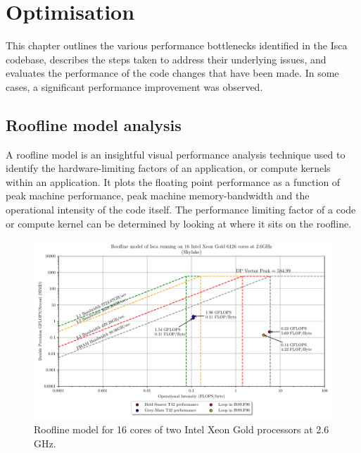 \documentclass[a4paper,11pt]{report}
\begin{document}
\let\textcircled=\pgftextcircled
\chapter[Optimisation]{Optimisation}
\label{chap:optimiations}
This chapter outlines the various performance bottlenecks identified in the Isca codebase, describes the steps taken to address their underlying issues, and evaluates the performance of the code changes that have been made. In some cases, a significant performance improvement was observed. 

\section{Roofline model analysis}
A roofline model is an insightful visual performance analysis technique used to identify the hardware-limiting factors of an application, or compute kernels within an application. It plots the floating point performance as a function of peak machine performance, peak machine memory-bandwidth and the operational intensity of the code itself. The performance limiting factor of a code or compute kernel can be determined by looking at where it sits on the roofline.

\begin{figure}[htbp]
\begin{center}
 \includegraphics[width=\textwidth]{img/roofline_model_bluepebble.pdf}
\caption[Roofline model of Isca on Intel hardware]{Roofline model for 16 cores of two Intel Xeon Gold processors at 2.6 GHz. } 
\label{fig:roofline}
\end{center}
\end{figure}
\newpage
\end{document}

